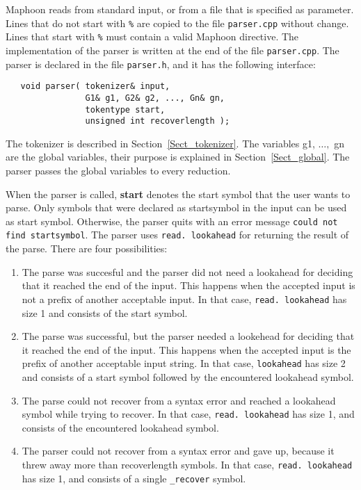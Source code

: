 \documentclass{article}
\begin{document}
\noindent
Maphoon reads from standard input, or from a file that is specified
as parameter.
Lines that do not start with \verb+%+ are copied to the file
\verb+parser.cpp+ without
change. Lines that start with \verb+%+ must contain a valid 
Maphoon directive. The implementation of the parser is written
at the end of the file \verb+parser.cpp+.
The parser is declared in the file \verb+parser.h+, and it has the following
interface:

\begin{verbatim}
   void parser( tokenizer& input,
                G1& g1, G2& g2, ..., Gn& gn,
                tokentype start, 
                unsigned int recoverlength ); 
\end{verbatim}

\noindent
The tokenizer is described in Section~\ref{Sect_tokenizer}. 
The variables g1, $ \ldots, $ gn are the global variables, their
purpose is explained in Section~\ref{Sect_global}. The parser passes 
the global variables to every reduction. 

When the parser is called, 
{\bf start} denotes the start symbol that the user wants to parse.
Only symbols that were declared as startsymbol in the input
can be used as start symbol. Otherwise, the parser quits with 
an error message \verb+could not find startsymbol+.
The parser uses \verb+read. lookahead+ for returning the result
of the parse. There are four possibilities:
\begin{enumerate}
\item
   The parse was succesful and the parser did not need a lookahead
   for deciding that it reached the end of the input. 
   This happens when the accepted input is not a prefix of another
   acceptable input.
   In that case, \verb+read. lookahead+ has size 1 and 
   consists of the start symbol.
\item
   The parse was successful, but the parser needed a lookehead for
   deciding that it reached the end of the input.
   This happens when the accepted input is the prefix of another
   acceptable input string. 
   In that case, \verb+lookahead+ has size 2 and consists of a start symbol
   followed by the encountered lookahead symbol.
\item
   The parse could not recover from a syntax error and reached
   a lookahead symbol while trying to recover.
   In that case, \verb+read. lookahead+ has size 1, and consists of
   the encountered lookahead symbol.
\item
   The parser could not recover from a syntax error and gave up,
   because it threw away more than recoverlength symbols.
   In that case, \verb+read. lookahead+ has size 1, and consists
   of a single \verb+_recover+ symbol.
\end{enumerate}
\end{document}
